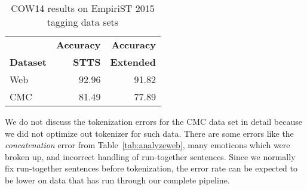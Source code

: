 \documentclass[11pt]{article}
\begin{document}
\begin{table*}[!htb]
  \centering
  \caption{Breakdown of tokenizer errors by types for the web data}
  \label{tab:analyzeweb}
\end{table*}

\begin{table}[!htb]
  \centering
  \begin{tabular}{|l|rr|}
    \hline
                     & \textbf{Accuracy} & \textbf{Accuracy} \\
    \textbf{Dataset} & \textbf{STTS} & \textbf{Extended} \\
    \hline
    Web & 92.96 & 91.82 \\ 
    CMC & 81.49 & 77.89 \\
    \hline
  \end{tabular}
  \caption{COW14 results on EmpiriST 2015 tagging data sets}
  \label{tab:resultstag}
\end{table}

We do not discuss the tokenization errors for the CMC data set in detail because we did not optimize out tokenizer for such data.
There are some errors like the \textit{concatenation} error from Table~\ref{tab:analyzeweb}, many emoticons which were broken up, and incorrect handling of run-together sentences.
Since we normally fix run-together sentences before tokenization, the error rate can be expected to be lower on data that has run through our complete pipeline.
\end{document}
